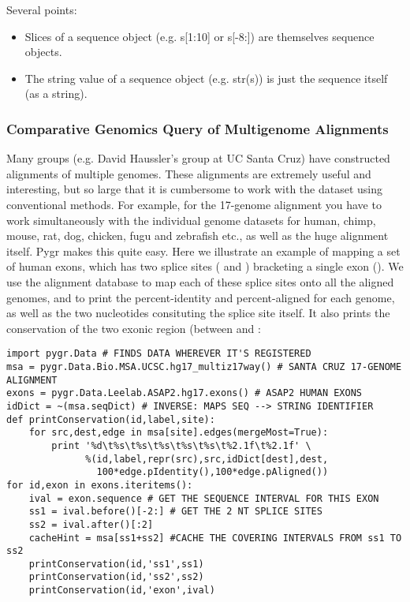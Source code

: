 \documentclass{howto}
\begin{document}
Several points:
\begin{itemize}

\item
   Slices of a sequence object (e.g. s[1:10] or s[-8:]) are themselves sequence objects.

\item    
The string value of a sequence object (e.g. str(s)) is just the sequence itself (as a string).

\end{itemize}

\subsubsection{Comparative Genomics Query of Multigenome Alignments}

Many groups (e.g. David Haussler's group at UC Santa Cruz) have constructed alignments of multiple genomes.  These alignments are extremely useful and interesting, but so large that it is cumbersome to work with the dataset using conventional methods.  For example, for the 17-genome alignment you have to work simultaneously with the individual genome datasets for human, chimp, mouse, rat, dog, chicken, fugu and zebrafish etc., as well as the huge alignment itself.  Pygr makes this quite easy.  Here we illustrate an example of mapping a set of human exons, which has two splice sites
( and ) bracketing a single exon ().
We use the alignment database to map each of these splice sites onto all the aligned
genomes, and to print the percent-identity and percent-aligned for each genome,
as well as the two nucleotides consituting the splice site itself.
It also prints the conservation of the two exonic region (between 
and : 

\begin{verbatim}
import pygr.Data # FINDS DATA WHEREVER IT'S REGISTERED
msa = pygr.Data.Bio.MSA.UCSC.hg17_multiz17way() # SANTA CRUZ 17-GENOME ALIGNMENT
exons = pygr.Data.Leelab.ASAP2.hg17.exons() # ASAP2 HUMAN EXONS
idDict = ~(msa.seqDict) # INVERSE: MAPS SEQ --> STRING IDENTIFIER
def printConservation(id,label,site):
    for src,dest,edge in msa[site].edges(mergeMost=True):
        print '%d\t%s\t%s\t%s\t%s\t%s\t%2.1f\t%2.1f' \
              %(id,label,repr(src),src,idDict[dest],dest,
                100*edge.pIdentity(),100*edge.pAligned())
for id,exon in exons.iteritems():
    ival = exon.sequence # GET THE SEQUENCE INTERVAL FOR THIS EXON
    ss1 = ival.before()[-2:] # GET THE 2 NT SPLICE SITES
    ss2 = ival.after()[:2]
    cacheHint = msa[ss1+ss2] #CACHE THE COVERING INTERVALS FROM ss1 TO ss2
    printConservation(id,'ss1',ss1)
    printConservation(id,'ss2',ss2)
    printConservation(id,'exon',ival)
\end{verbatim}
\end{document}
